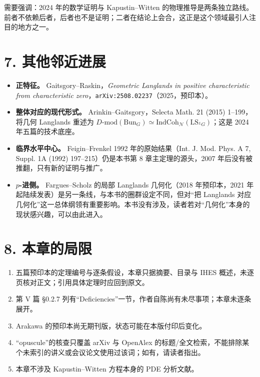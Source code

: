 需要强调：2024 年的数学证明与 Kapustin--Witten 的物理推导是两条独立路线。前者不依赖后者，后者也不是证明；二者在结论上会合，这正是这个领域最引人注目的地方之一。

\section*{7. 其他邻近进展}

\begin{itemize}
\item \textbf{正特征。} Gaitsgory--Raskin，\emph{Geometric Langlands in positive characteristic from characteristic zero}，\texttt{arXiv:2508.02237}（2025，预印本）。
\item \textbf{整体对应的现代形式。} Arinkin--Gaitsgory，Selecta Math. 21 (2015) 1--199，将几何 Langlands 重述为 $D\text{-}\mathrm{mod}(\mathrm{Bun}_G)\simeq\mathrm{IndCoh}_{\mathcal N}(\mathrm{LS}_{{}^L G})$；这是 2024 年五篇的技术底座。
\item \textbf{临界水平中心。} Feigin--Frenkel 1992 年的原始结果（Int. J. Mod. Phys. A 7, Suppl. 1A (1992) 197--215）仍是本书第 8 章主定理的源头，2007 年后没有被推翻，只有新的证明与推广。
\item \textbf{$p$-进侧。} Fargues--Scholz 的局部 Langlands 几何化（2018 年预印本，2021 年起陆续发表）是另一条线，与本书的圈群设定不同，但对“把 Langlands 对应几何化”这一总体纲领有重要影响。本书没有涉及，读者若对“几何化”本身的现状感兴趣，可以由此进入。
\end{itemize}

\section*{8. 本章的局限}

\begin{enumerate}
\item 五篇预印本的定理编号与逐条假设，本章只据摘要、目录与 IHES 概述，未逐页核对正文；引用具体定理时应回到原文。
\item 第 V 篇 §0.2.7 列有“Deficiencies”一节，作者自陈尚有未尽事项；本章未逐条展开。
\item Arakawa 的预印本尚无期刊版，状态可能在本版付印后变化。
\item “opuscule”的核查只覆盖 arXiv 与 OpenAlex 的标题/全文检索，不能排除某个未索引的讲义或会议论文使用过该词；如有，请读者指出。
\item 本章不涉及 Kapustin--Witten 方程本身的 PDE 分析文献。
\end{enumerate}

